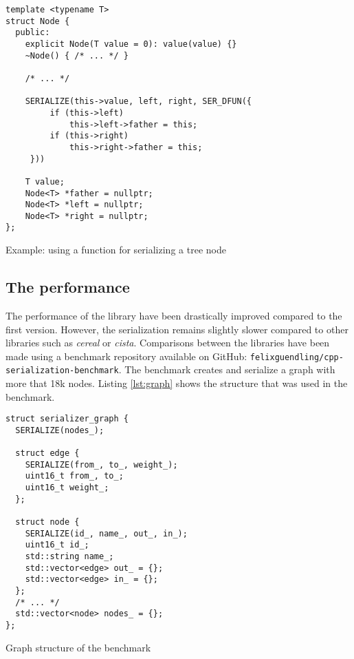 \begin{listing}[ht!]
\begin{verbatim}
template <typename T>
struct Node {
  public:
    explicit Node(T value = 0): value(value) {}
    ~Node() { /* ... */ }

    /* ... */

    SERIALIZE(this->value, left, right, SER_DFUN({
         if (this->left)
             this->left->father = this;
         if (this->right)
             this->right->father = this;
     }))

    T value;
    Node<T> *father = nullptr;
    Node<T> *left = nullptr;
    Node<T> *right = nullptr;
};
\end{verbatim}
\caption{Example: using a function for serializing a tree node}
\label{lst:treenode}
\end{listing}

\clearpage{}
\subsection{The performance}

The performance of the library have been drastically improved compared to the
first version. However, the serialization remains slightly slower compared to
other libraries such as \textit{cereal} or \textit{cista}. Comparisons between
the libraries have been made using a benchmark repository available on GitHub:
\texttt{felixguendling/cpp-serialization-benchmark}. The benchmark creates and
serialize a graph with more that 18k nodes. Listing \ref{lst:graph} shows the
structure that was used in the benchmark.

\begin{listing}[ht!]
\begin{verbatim}
struct serializer_graph {
  SERIALIZE(nodes_);

  struct edge {
    SERIALIZE(from_, to_, weight_);
    uint16_t from_, to_;
    uint16_t weight_;
  };

  struct node {
    SERIALIZE(id_, name_, out_, in_);
    uint16_t id_;
    std::string name_;
    std::vector<edge> out_ = {};
    std::vector<edge> in_ = {};
  };
  /* ... */
  std::vector<node> nodes_ = {};
};
\end{verbatim}
\caption{Graph structure of the benchmark}
\label{lst:graph}
\end{listing}

